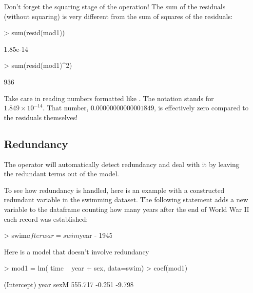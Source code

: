 Don't forget the squaring stage of the operation!  The sum of the
residuals (without squaring) 
is very different from the sum of squares of the residuals:
\begin{Schunk}
\begin{Sinput}
> sum(resid(mod1))
\end{Sinput}
\begin{Soutput}
[1] 1.85e-14
\end{Soutput}
\begin{Sinput}
> sum(resid(mod1)^2)
\end{Sinput}
\begin{Soutput}
[1] 936
\end{Soutput}
\end{Schunk}
Take care in reading numbers formatted like 
.   The notation stands for $1.849 \times 10^{-14}$.
That number, $0.00000000000001849$, is effectively zero compared to the
residuals themselves!


\subsection{Redundancy}

The  operator will automatically detect redundancy and deal
with it by leaving the redundant terms out of the model.  

To see how redundancy is handled, here is an example with a
constructed redundant variable in the swimming dataset.  
The following statement adds a new variable to the
dataframe counting how many years after the end of World War II each
record was established:
\begin{Schunk}
\begin{Sinput}
> swim$afterwar = swim$year - 1945
\end{Sinput}
\end{Schunk}

Here is a model that doesn't involve redundancy
\begin{Schunk}
\begin{Sinput}
> mod1 = lm( time ~ year + sex, data=swim)
> coef(mod1)
\end{Sinput}
\begin{Soutput}
(Intercept)        year        sexM 
    555.717      -0.251      -9.798 
\end{Soutput}
\end{Schunk}

